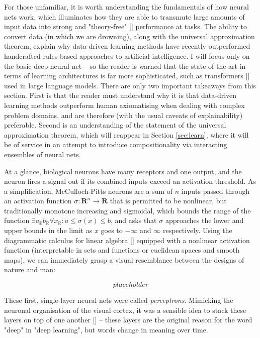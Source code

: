 For those unfamiliar, it is worth understanding the fundamentals of how neural nets work, which illuminates how they are able to transmute large amounts of input data into strong and "theory-free" [] performance at tasks. The ability to convert data (in which we are drowning), along with the universal approximation theorem, explain why data-driven learning methods have recently outperformed handcrafted rules-based approaches to artificial intelligence. I will focus only on the basic deep neural net -- so the reader is warned that the state of the art in terms of learning architectures is far more sophisticated, such as transformers [] used in large language models. There are only two important takeaways from this section. First is that the reader must understand why it is that data-driven learning methods outperform human axiomatising when dealing with complex problem domains, and are therefore (with the usual caveats of explainability) preferable. Second is an understanding of the statement of the universal approximation theorem, which will reappear in Section \ref{sec:learn}, where it will be of service in an attempt to introduce compositionality via interacting ensembles of neural nets.

 At a glance, biological neurons have many receptors and one output, and the neuron fires a signal out if its combined inputs exceed an activation threshold. As a simplification, McCulloch-Pitts neurons are a sum of $n$ inputs passed through an activation function $\sigma: \mathbf{R}^n \rightarrow \mathbf{R}$ that is permitted to be nonlinear, but traditionally monotone increasing and sigmoidal, which bounds the range of the function $\exists a_{\mathbb{R}} b_{\mathbb{R}} \forall x_{\mathbb{R}} : a \leq \sigma(x) \leq b$, and asks that $\sigma$ approaches the lower and upper bounds in the limit as $x$ goes to $-\infty$ and $\infty$ respectively. Using the diagrammatic calculus for linear algebra [] equipped with a nonlinear activation function (interpretable in sets and functions or euclidean spaces and smooth maps), we can immediately grasp a visual resemblance between the designs of nature and man:

\[placeholder\]

 These first, single-layer neural nets were called \emph{perceptrons}. Mimicking the neuronal organisation of the visual cortex, it was a sensible idea to stack these layers on top of one another [] -- these layers are the original reason for the word "deep" in "deep learning", but words change in meaning over time.

